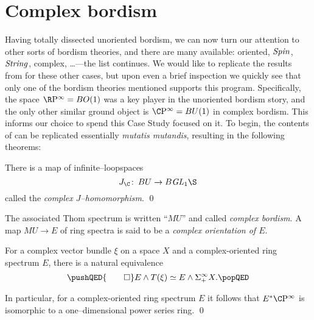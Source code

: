 
\chapter{Complex bordism}\label{ComplexBordismChapter}


Having totally dissected unoriented bordism, we can now turn our attention to other sorts of bordism theories, and there are many available: oriented, $\mathit{Spin}$, $\mathit{String}$, complex, \ldots---the list continues.  We would like to replicate the results from  for these other cases, but upon even a brief inspection we quickly see that only one of the bordism theories mentioned supports this program.  Specifically, the space $\RP^\infty = BO(1)$ was a key player in the unoriented bordism story, and the only other similar ground object is $\CP^\infty = BU(1)$ in complex bordism.  This informs our choice to spend this Case Study focused on it.  To begin, the contents of  can be replicated essentially \textit{mutatis mutandis}, resulting in the following theorems:

\begin{theorem}\label{ComplexJHomomorphism}
There is a map of infinite--loopspaces \[J_{\C}\co BU \to B \GL_1 \S\] called the \textit{complex $J$--homomorphism}. \qed
\end{theorem}

\begin{definition}\label{DefnComplexOrientation}
The associated Thom spectrum is written ``$MU$'' and called \textit{complex bordism}.  A map $MU \to E$ of ring spectra is said to be a \textit{complex orientation of $E$}.
\end{definition}

\begin{theorem}\label{ThomIsomOverC}
For a complex vector bundle $\xi$ on a space $X$ and a complex-oriented ring spectrum $E$, there is a natural equivalence \[\pushQED{\qed}
E \sm T(\xi) \simeq E \sm \Susp^\infty_+ X. \qedhere
\popQED\]
\end{theorem}

\begin{corollary}\label{CPinftyNiceCalculation}
In particular, for a complex-oriented ring spectrum $E$ it follows that $E^* \CP^\infty$ is isomorphic to a one--dimensional power series ring. \qed
\end{corollary}

